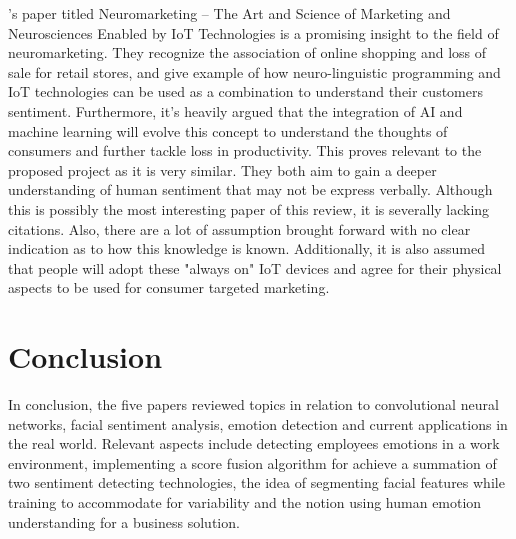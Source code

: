  \citeauthor{arthmann}'s paper titled Neuromarketing – The Art and Science of Marketing and Neurosciences Enabled by IoT Technologies is a promising insight to the field of neuromarketing. They recognize the association of online shopping and loss of sale for retail stores, and give example of how neuro-linguistic programming and IoT technologies can be used as a combination to understand their customers sentiment. Furthermore, it's heavily argued that the integration of AI and machine learning will evolve this concept to understand the thoughts of consumers and further tackle loss in productivity. This proves relevant to the proposed project as it is very similar. They both aim to gain a deeper understanding of human sentiment that may not be express verbally. Although this is possibly the most interesting paper of this review, it is severally lacking citations. Also, there are a lot of assumption brought forward with no clear indication as to how this knowledge is known. Additionally, it is also assumed that people will adopt these "always on" IoT devices and agree for their physical aspects to be used for consumer targeted marketing. 

 \section{Conclusion}
 In conclusion, the five papers reviewed topics in relation to convolutional neural networks, facial sentiment analysis, emotion detection and current applications in the real world. Relevant aspects include detecting employees emotions in a work environment, implementing a score fusion algorithm for achieve a summation of two sentiment detecting technologies, the idea of segmenting facial features while training to accommodate for variability and the notion using human emotion understanding for a business solution.